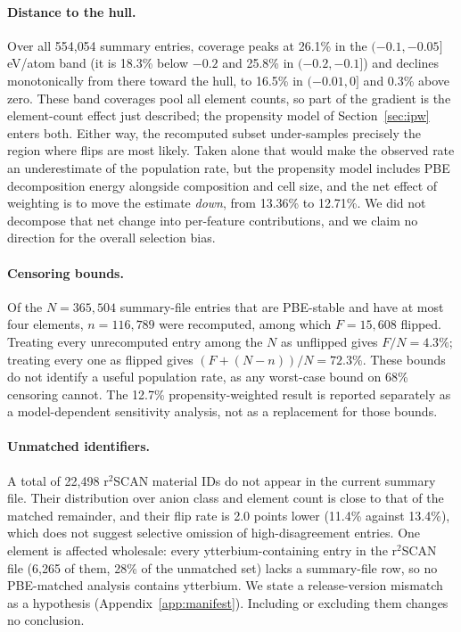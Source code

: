 \documentclass[11pt]{article}
\begin{document}
\paragraph{Distance to the hull.} Over all 554{,}054 summary entries, coverage peaks at 26.1\% in the
$(-0.1,-0.05]$ eV/atom band (it is 18.3\% below $-0.2$ and 25.8\% in $(-0.2,-0.1]$) and declines
monotonically from
there toward the hull, to 16.5\% in $(-0.01,0]$ and 0.3\% above zero. These band
coverages pool all element counts, so part of the gradient is the element-count effect
just described; the propensity model of Section~\ref{sec:ipw} enters both. Either way,
the recomputed subset under-samples precisely the region where flips are most likely.
Taken alone that would make the observed rate an underestimate of the population rate,
but the propensity model includes PBE decomposition energy alongside
composition and cell size, and the net effect of weighting is to move the estimate
\emph{down}, from 13.36\% to 12.71\%. We did not decompose that net change into
per-feature contributions, and we claim no direction for the overall selection bias.

\paragraph{Censoring bounds.} Of the $N=365{,}504$ summary-file entries that are
PBE-stable and have at most four elements, $n=116{,}789$ were recomputed, among which
$F=15{,}608$ flipped. Treating every unrecomputed entry among the $N$ as unflipped gives
$F/N = 4.3\%$; treating every one as flipped gives $(F + (N-n))/N = 72.3\%$. These bounds
do not identify a useful population rate, as any worst-case bound on 68\% censoring
cannot. The 12.7\% propensity-weighted result is reported separately as a
model-dependent sensitivity analysis, not as a replacement for those bounds.

\paragraph{Unmatched identifiers.} A total of 22{,}498 r$^2$SCAN material IDs do not appear in the
current summary file. Their distribution over anion class and element count is close to
that of the matched remainder, and their flip rate is 2.0 points lower (11.4\% against
13.4\%), which does not suggest selective omission of high-disagreement entries. One
element is affected wholesale: every ytterbium-containing entry in the r$^2$SCAN file
(6{,}265 of them, 28\% of the unmatched set) lacks a summary-file row, so no PBE-matched
analysis contains ytterbium. We state a
release-version mismatch as a hypothesis (Appendix~\ref{app:manifest}). Including or
excluding them changes no conclusion.
\end{document}
